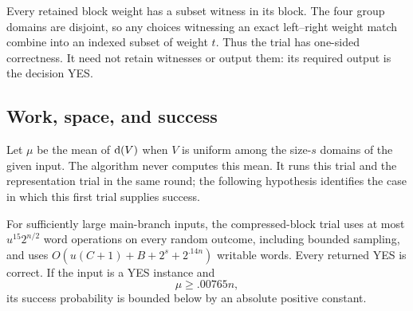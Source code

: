 Every retained block weight has a subset witness in its block. The
four group domains are disjoint, so any choices witnessing an exact
left--right weight match combine into an indexed subset of weight
$t$. Thus the trial has one-sided correctness. It need not retain
witnesses or output them: its required output is the decision YES.

\subsection{Work, space, and success}

Let $\mu$ be the mean of $\mathrm{d}(V)$ when $V$ is uniform among
the size-$s$ domains of the given input. The algorithm never computes
this mean. It runs this trial and the representation trial in the same
round; the following hypothesis identifies the case in which this
first trial supplies success.

\begin{lemma}
\label{lem:compressed}
For sufficiently large main-branch inputs, the compressed-block trial
uses at most $u^{15}2^{n/2}$ word operations on every random outcome,
including bounded sampling, and uses
$O(u(C+1)+B+2^s+2^{.14n})$ writable words. Every returned YES is
correct. If the input is a YES instance and
\begin{equation}
\label{alg:high-deficiency}
 \mu\ge .00765n,
\end{equation}
its success probability is bounded below by an absolute positive
constant.
\end{lemma}

